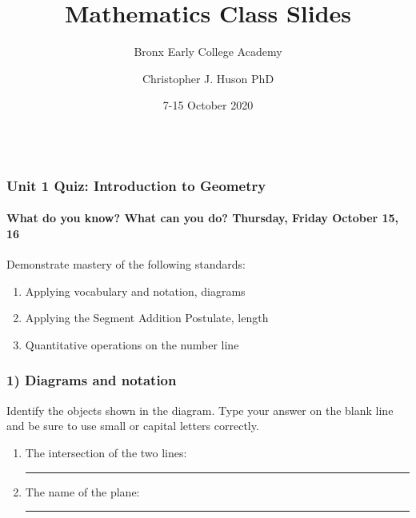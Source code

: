 \documentclass{beamer}
\title{Mathematics Class Slides}
\subtitle{Bronx Early College Academy}
\author{Christopher J. Huson PhD}
\date{7-15 October 2020}
\begin{document}
\section[Outline]{}


\frame
{
  \frametitle{\\Unit 1 Quiz: Introduction to Geometry}
  \framesubtitle{What do you know? What can you do?  \hfill \alert{Thursday, Friday October 15, 16}} 
    Demonstrate mastery of the following standards:
    \begin{enumerate}
      \item Applying vocabulary and notation, diagrams
      \item Applying the Segment Addition Postulate, length
      \item Quantitative operations on the number line
    \end{enumerate}

}

\frame
  {
    \frametitle{1) Diagrams and notation}
    Identify the objects shown in the diagram. Type your answer on the blank line and be sure to use small or capital letters correctly.
    \begin{enumerate} \vspace{0.5cm}
      \item The intersection of the two lines:  \rule{3cm}{0.15mm} \bigskip
      \item The name of the plane:  \rule{3cm}{0.15mm} \bigskip
      \end{enumerate}
      \begin{center}
    \end{center}
  }
\end{document}
